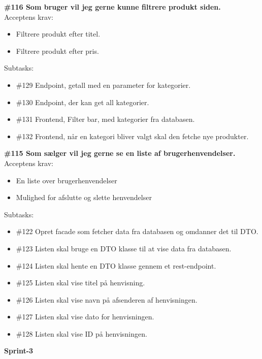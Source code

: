 \documentclass[11pt]{report}
\begin{document}
\noindent\textbf{\#116 Som bruger vil jeg gerne kunne filtrere produkt siden.}\\
\noindent Acceptens krav:
\begin{itemize}[topsep=0pt, partopsep=0pt]
  \item Filtrere produkt efter titel.
  \item Filtrere produkt efter pris.
\end{itemize}
\noindent Subtasks:
\begin{itemize}[topsep=0pt, partopsep=0pt]
  \item \#129 Endpoint, getall med en parameter for kategorier.
  \item \#130 Endpoint, der kan get all kategorier.
  \item \#131 Frontend, Filter bar, med kategorier fra databasen.
  \item \#132 Frontend, når en kategori bliver valgt skal den fetche nye produkter.
\end{itemize}

\noindent\textbf{\#115 Som sælger vil jeg gerne se en liste af brugerhenvendelser.}\\
\noindent Acceptens krav:
\begin{itemize}[topsep=0pt, partopsep=0pt]
  \item En liste over brugerhenvendelser
  \item Mulighed for afslutte og slette henvendelser
\end{itemize}
\noindent Subtasks:
\begin{itemize}[topsep=0pt, partopsep=0pt]
  \item \#122 Opret facade som fetcher data fra databasen og omdanner det til DTO.
  \item \#123 Listen skal bruge en DTO klasse til at vise data fra databasen.
  \item \#124 Listen skal hente en DTO klasse gennem et rest-endpoint.
  \item \#125 Listen skal vise titel på henvisning.
  \item \#126 Listen skal vise navn på afsenderen af henvisningen.
  \item \#127 Listen skal vise dato for henvisningen.
  \item \#128 Listen skal vise ID på henvisningen.
\end{itemize}

\noindent\textbf{Sprint-3}
\end{document}
